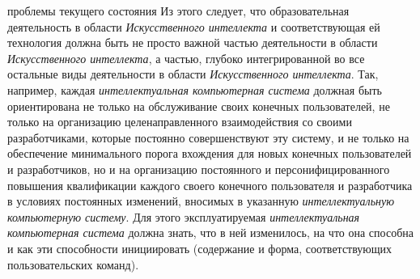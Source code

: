 \begin{scnsubstruct}
\begin{scnrelfromset}{проблемы текущего состояния}
{            Из этого следует, что образовательная деятельность в области \textit{Искусственного интеллекта} и соответствующая ей технология должна быть не просто важной частью деятельности в области \textit{Искусственного интеллекта}, а частью, глубоко интегрированной во все остальные виды деятельности в области \textit{Искусственного интеллекта}. Так, например, каждая \textit{интеллектуальная компьютерная система} должная быть ориентирована не только на обслуживание своих конечных пользователей, не только на организацию целенаправленного взаимодействия со своими разработчиками, которые постоянно совершенствуют эту систему, и не только на обеспечение минимального порога вхождения для новых конечных пользователей и разработчиков, но и на организацию постоянного и персонифицированного повышения квалификации каждого своего конечного пользователя и разработчика в условиях постоянных изменений, вносимых в указанную \textit{интеллектуальную компьютерную систему}. Для этого эксплуатируемая \textit{интеллектуальная компьютерная система} должна знать, что в ней изменилось, на что она способна и как эти способности инициировать (содержание и форма, соответствующих пользовательских команд).}
    \end{scnrelfromset}
    

\end{scnsubstruct}
